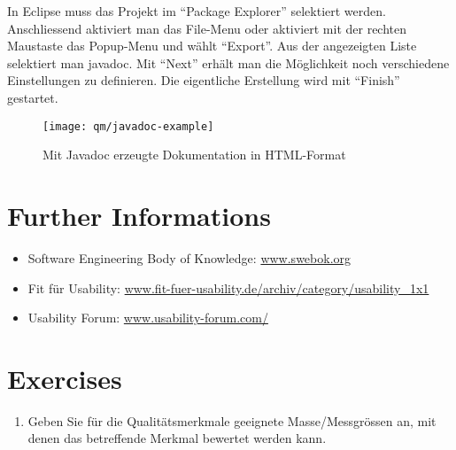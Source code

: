 \newslide
In Eclipse muss das Projekt im ``Package Explorer'' selektiert
werden. Anschliessend aktiviert man das File-Menu oder aktiviert mit der
rechten Maustaste das Popup-Menu und wählt ``Export''. Aus der angezeigten
Liste selektiert man javadoc. Mit ``Next'' erhält man die Möglichkeit noch
verschiedene Einstellungen zu definieren. Die eigentliche Erstellung wird mit
``Finish'' gestartet.
\begin{figure}[H]
  \centering
\texttt{[image: qm/javadoc-example]}
  \caption{Mit Javadoc erzeugte Dokumentation in HTML-Format}
  \label{fig:javadoc}
\end{figure}
%
\section{Further Informations}
\begin{itemize}
\item Software Engineering Body of Knowledge:
  \href{http://www.swebok.org}{www.swebok.org}
\item Fit für Usability:
\href{http://www.fit-fuer-usability.de/archiv/category/usability_1x1/}
  {www.fit-fuer-usability.de/archiv/category/usability\_1x1}
\item Usability Forum:
\href{http://www.usability-forum.com/}{www.usability-forum.com/}
\end{itemize}
\section{Exercises}
\begin{enumerate}
\item Geben Sie für die Qualitätsmerkmale geeignete Masse/Messgrössen an, mit
  denen das betreffende Merkmal bewertet werden kann.
\end{enumerate}

